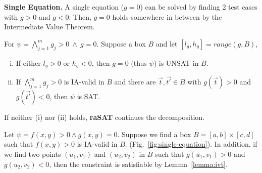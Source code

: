 \documentclass[runningheads,a4paper,oribibl]{llncs}
\newcommand{\suppress}[1]{} %
\begin{document}
\medskip \noindent 
\textbf{Single Equation.}
A single equation (${g=0}$) can be solved by finding 2 test cases with $g > 0$ and $g < 0$.
Then, $g=0$ holds somewhere in between by the Intermediate Value Theorem.

\begin{lemma} \label{lemma:ivt}
For $\psi =
\bigwedge \limits_{j=1}^m g_j > 0~\wedge~g = 0$.
Suppose a box
$B$
and
let ${[l_g, h_g] = range(g, B)}$, 
\begin{enumerate}[(i)]
\item If either $l_g > 0$ or $h_g < 0$, then $g = 0$ (thus $\psi$) is UNSAT in $B$. 
\item If $\bigwedge \limits_{j=1}^m g_j > 0$ is IA-valid in $B$ and there are $\vec{t},\vec{t'} \in B$
  with $g(\vec{t}) > 0$ and $g(\vec{t'}) < 0$, then $\psi$ is SAT.
\end{enumerate}
\end{lemma}

\suppress{
\begin{proof}
\begin{enumerate}[(i)]
\item If $l_g > 0$ or $h_g < 0$, then $g=0$ cannot be satisfied in box $I$.
  As a result, $F$ is UNSAT in $I$. 
\item If there are two instances $\vec{t},\vec{t'}$ in the box with
  $g(\vec{t}) > 0$ and $g(\vec{t'}) < 0$, it is clear from the Intermediate
  Value Theorem that there exist one point $\vec{t_0}$ between $\vec{t}$ and
  $\vec{t'}$ such that $g(\vec{t_0}) = 0$. In addition, because
  $\bigwedge \limits_{j}^m f_j > 0$ is IA-VALID in $I$, $\vec{t_0}$ also
  satisfies $\bigwedge \limits_{j}^m f_j > 0$.
  As a result, $F$ is satisfiable with $\vec{t_0}$ as the SAT instance.
\end{enumerate}
\end{proof}
}
If neither (i) nor (ii) holds, \textbf{raSAT} continues the decomposition.
\begin{example}
  Let $\psi = f(x, y) > 0 \wedge g(x, y) = 0$.
  Suppose we find a box 
  ${B = [a, b] \times [c, d]}$
  such that $f(x, y) > 0$ is IA-valid in $B$.
  (Fig.~\ref{fig:single-equation}).
  In addition, 
  if we find two points $(u_1, v_1)$ and $(u_2, v_2)$ in $B$ such that
  $g(u_1, v_1) > 0$ and $g(u_2, v_2) < 0$,
  then the constraint is satisfiable by Lemma~\ref{lemma:ivt}. 
\end{example}
\end{document}
